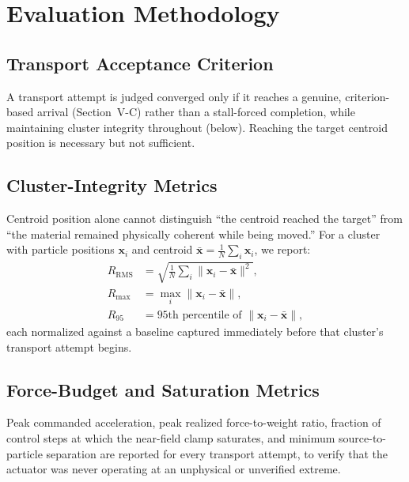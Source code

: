 \documentclass[journal]{IEEEtran}
\begin{document}
\section{Evaluation Methodology}

\subsection{Transport Acceptance Criterion}
A transport attempt is judged converged only if it reaches a genuine,
criterion-based arrival (Section~V-C) rather than a stall-forced
completion, while maintaining cluster integrity throughout (below).
Reaching the target centroid position is necessary but not sufficient.

\subsection{Cluster-Integrity Metrics}
Centroid position alone cannot distinguish ``the centroid reached the
target'' from ``the material remained physically coherent while being
moved.'' For a cluster with particle positions $\mathbf{x}_i$ and centroid
$\bar{\mathbf{x}}=\tfrac{1}{N}\sum_i\mathbf{x}_i$, we report:
\begin{align}
R_{\mathrm{RMS}} &= \sqrt{\tfrac{1}{N}\textstyle\sum_i \|\mathbf{x}_i-\bar{\mathbf{x}}\|^2}, \label{eq:rms}\\
R_{\max} &= \max_i \|\mathbf{x}_i-\bar{\mathbf{x}}\|, \label{eq:rmax}\\
R_{95} &= \text{95th percentile of } \|\mathbf{x}_i-\bar{\mathbf{x}}\|, \label{eq:r95}
\end{align}
each normalized against a baseline captured immediately before that
cluster's transport attempt begins.

\subsection{Force-Budget and Saturation Metrics}
Peak commanded acceleration, peak realized force-to-weight ratio, fraction
of control steps at which the near-field clamp saturates, and minimum
source-to-particle separation are reported for every transport attempt, to
verify that the actuator was never operating at an unphysical or
unverified extreme.
\end{document}
